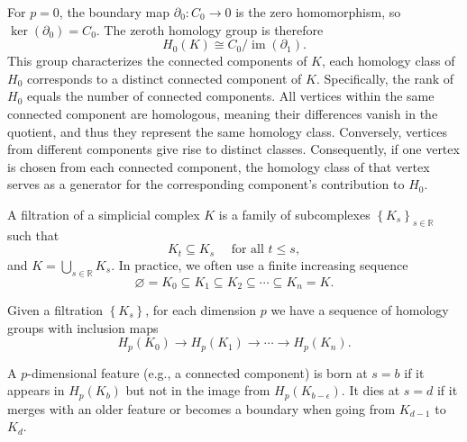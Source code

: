 \documentclass{ws-mplb}
\begin{document}
For \(p=0\), the boundary map \(\partial_0: C_0 \to 0\) is the zero homomorphism, so \(\ker(\partial_0)=C_0\). The zeroth homology group is therefore
 $$H_0(K) \cong C_0 / \operatorname{im}(\partial_1).$$
This group characterizes the connected components of \(K\), each homology class of $H_0$ corresponds to a distinct connected component of $K$.
Specifically, the rank of \(H_0\) equals the number of connected components.
All vertices within the same connected component are homologous, meaning their differences vanish in the quotient, and thus they represent the same homology class.
Conversely, vertices from different components give rise to distinct classes.
Consequently, if one vertex is chosen from each connected component, the homology class of that vertex serves as a generator for the corresponding component's contribution to \(H_0\).

\begin{definition}[Filtration]
A filtration of a simplicial complex $K$ is a family of subcomplexes $\left\{K_s\right\}_{s\in \mathbb{R}}$ such that
$$
K_t \subseteq K_s \quad \text { for all } t \leq s,
$$
and $K=\bigcup_{s\in \mathbb{R}} K_s .$
In practice, we often use a finite increasing sequence
$${\varnothing} = K_0 \subseteq K_1 \subseteq K_2 \subseteq \cdots \subseteq K_n  = K .
$$
\end{definition}

Given a filtration $\left\{K_s\right\}$, for each dimension $p$ we have a sequence of homology groups with inclusion maps
$$
H_p\left(K_0\right) \rightarrow H_p\left(K_1\right) \rightarrow \cdots \rightarrow H_p\left(K_n\right) .
$$

A $p$-dimensional feature (e.g., a connected component) is born at $s=b$ if it appears in $H_p\left(K_b\right)$ but not in the image from $H_p\left(K_{b-\epsilon}\right)$.
It dies at $s=d$ if it merges with an older feature or becomes a boundary when going from $K_{d-1}$ to $K_d$.

\end{document}
